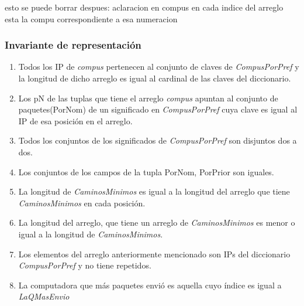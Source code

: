 esto se puede borrar despues:
aclaracion en compus en cada indice del arreglo esta la compu correspondiente a esa numeracion

\subsubsection*{Invariante de representación}

\begin{enumerate}
	\item Todos los IP de \textit{compus} pertenecen al conjunto de claves de \textit{CompusPorPref} y la longitud de dicho arreglo es igual al cardinal de las claves del diccionario. 
	\item Los pN de las tuplas que tiene el arreglo \textit{compus} apuntan al conjunto de paquetes(PorNom) de un significado en \textit{CompusPorPref} cuya clave es igual al IP de esa posición en el arreglo.
	\item Todos los conjuntos de los significados de \textit{CompusPorPref} son disjuntos dos a dos.
  \item Los conjuntos de los campos de la tupla PorNom, PorPrior son iguales.
  \item La longitud de \textit{CaminosMinimos} es igual a la longitud del arreglo que tiene \textit{CaminosMinimos} en cada posición.
  \item La longitud del arreglo, que tiene un arreglo de \textit{CaminosMinimos} es menor o igual a la longitud de \textit{CaminosMinimos}.
  \item Los elementos del arreglo anteriormente mencionado son IPs del diccionario \textit{CompusPorPref} y no tiene repetidos.
  \item La computadora que más paquetes envió es aquella cuyo índice es igual a \textit{LaQMasEnvio}

\end{enumerate}

